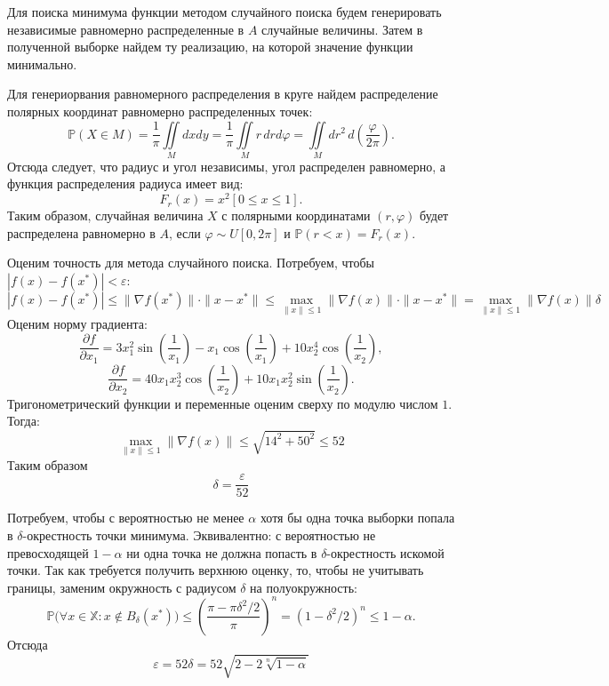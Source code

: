 \documentclass[12pt, a4paper]{article} %
\renewcommand{\le}{\leqslant}
\renewcommand{\phi}{\varphi}
\def\Pro{\mathbb{P}} %
\begin{document}
Для поиска минимума функции методом случайного поиска будем генерировать 
независимые равномерно распределенные в $A$ случайные  величины.
Затем в полученной выборке найдем ту реализацию, на которой значение функции минимально. 

Для генериорвания равномерного распределения в круге найдем распределение полярных координат равномерно распределенных точек:
\[
    \mathbb{P}(X \in M) = \dfrac{1}{\pi}\iint\limits_Mdxdy = \dfrac{1}{\pi}\iint\limits_Mr\,drd\varphi = \iint\limits_Mdr^2\,d\left(\dfrac{\varphi}{2\pi}\right).
\] 
Отсюда следует, что радиус и угол независимы, угол распределен равномерно, а функция распределения радиуса имеет вид:
\[
    F_r(x) = x^2\left[ 0 \le x \le 1 \right].
\] 
Таким образом, случайная величина $X$ с полярными координатами  $(r, \phi)$
будет распределена равномерно в  $A$, если  $\phi \sim U[0, 2\pi]$ и 
$\Pro(r < x) = F_r(x)$. 

Оценим точность для метода случайного поиска. 
Потребуем, чтобы $|f(x) - f(x^*)| < \varepsilon$:
$$
|f(x) - f(x^*)| \leqslant \| \nabla f(x^*) \| \cdot\|x - x^*\| \leqslant
\max\limits_{\| x \| \leqslant 1} \| \nabla f(x) \| \cdot \| x - x^* \| =
\max\limits_{\| x \| \leqslant 1} \| \nabla f(x) \| \delta
$$
Оценим норму градиента:
\[
\frac{\partial f}{\partial x_1} = 3x_1^2\sin\left(\frac{1}{x_1}\right) - x_1\cos\left(\frac{1}{x_1}\right) + 10x_2^4\cos\left(\frac{1}{x_2}\right),
\]
\[
\frac{\partial f}{\partial x_2} = 40x_1x_2^3 \cos\left(\frac{1}{x_2}\right) + 10x_1x_2^2\sin\left(\frac{1}{x_2}\right).
\]
Тригонометрический функции и переменные оценим сверху по модулю числом $1$. Тогда:
$$
\max\limits_{\| x \| \leqslant 1} \| \nabla f(x) \| \leqslant
\sqrt{14^2 + 50^2} \leqslant 52
$$
Таким образом
$$
\delta = \frac{\varepsilon}{52}
$$

Потребуем, чтобы с вероятностью не менее $\alpha$ хотя бы одна точка выборки попала в $\delta$-окрестность точки минимума.
Эквивалентно: с вероятностью не превосходящей $1 - \alpha$ ни одна точка не должна попасть в $\delta$-окрестность искомой точки. Так как требуется получить верхнюю оценку, то, чтобы не учитывать границы, заменим окружность с радиусом $\delta$ на полуокружность:
$$
\mathbb{P}\bigl( \forall x \in \mathbb{X} \colon x \notin B_\delta(x^*) \bigr) \leqslant 
\left( \frac{\pi - \pi \delta^2/2}{\pi} \right)^n = \left( 1 - \delta^2/2 \right)^n 
\leqslant 1 - \alpha.
$$
Отсюда 
$$
\varepsilon = 52\delta = 52\sqrt{2 - 2\sqrt[n]{1 - \alpha}}
$$
\end{document}
